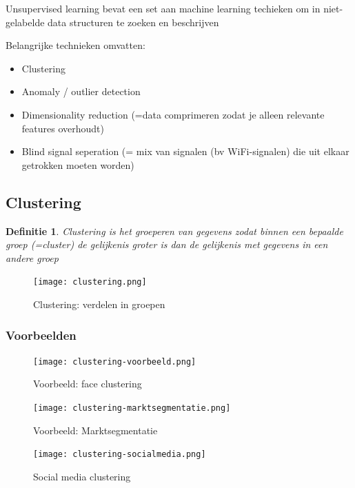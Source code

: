 \documentclass{article}
\newtheorem{theorem}{Definitie}[section]
\begin{document}
Unsupervised learning bevat een set aan machine learning techieken om in
niet-gelabelde data structuren te zoeken en beschrijven

Belangrijke technieken omvatten:

\begin{itemize}
    \item Clustering
    \item Anomaly / outlier detection
    \item Dimensionality reduction (=data comprimeren zodat je alleen relevante features overhoudt)
    \item Blind signal seperation (= mix van signalen (bv WiFi-signalen) die uit elkaar getrokken moeten worden)
\end{itemize}

\subsection{Clustering}

\begin{theorem}
    Clustering is het groeperen van gegevens zodat binnen een bepaalde groep (=cluster) 
    de gelijkenis groter is dan de gelijkenis met gegevens in een andere groep
\end{theorem}

\begin{figure}[H]
    \centering
    \texttt{[image: clustering.png]}
    \caption{Clustering: verdelen in groepen}
\end{figure}

\subsubsection{Voorbeelden}

\begin{figure}[H]
    \centering
    \texttt{[image: clustering-voorbeeld.png]}
    \caption{Voorbeeld: face clustering}
\end{figure}

\begin{figure}[H]
    \centering
    \texttt{[image: clustering-marktsegmentatie.png]}
    \caption{Voorbeeld: Marktsegmentatie}
\end{figure}

\begin{figure}[H]
    \centering
    \texttt{[image: clustering-socialmedia.png]}
    \caption{Social media clustering}
\end{figure}
\end{document}
